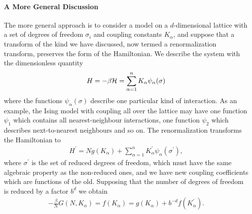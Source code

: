 \paragraph{A More General Discussion}
The more general approach is to consider a model on a $d$-dimensional lattice with a set of degrees of freedom $\sigma_{i}$ and coupling constants $K_{\alpha}$, and suppose that a transform of the kind we have discussed, now termed a renormalization transform, preserves the form of the Hamiltonian. We describe the system with the dimensionless quantity
\begin{align*}
	H = -\beta\mathcal{H} = \sum\limits_{\alpha = 1}^{n}K_{\alpha}\psi_{\alpha}(\sigma)
\end{align*}
where the functions $\psi_{\alpha}(\sigma)$ describe one particular kind of interaction. As an example, the Ising model with coupling all over the lattice may have one function $\psi_{1}$ which contains all nearest-neighbour interactions, one function $\psi_{2}$ which describes next-to-nearest neighbours and so on. The renormalization transforms the Hamiltonian to
\begin{align*}
	H^{\prime} = Ng(K_{\alpha}) + \sum\limits_{\alpha = 1}^{n}K_{\alpha}^{\prime}\psi_{\alpha}(\sigma^{\prime}),
\end{align*}
where $\sigma^{\prime}$ is the set of reduced degrees of freedom, which must have the same algebraic property as the non-reduced ones, and we have new coupling coefficients which are functions of the old. Supposing that the number of degrees of freedom is reduced by a factor $b^{d}$ we obtain
\begin{align*}
	-\frac{\beta}{N}G\left(N, K_{\alpha}\right) = f\left(K_{\alpha}\right) = g(K_{\alpha}) + b^{-d}f\left(K_{\alpha}^{\prime}\right).
\end{align*}

